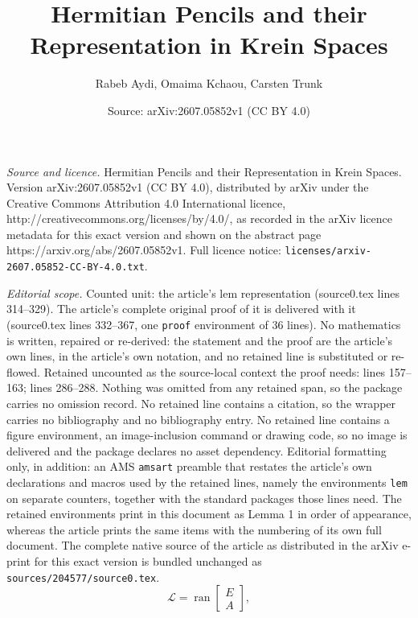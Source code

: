 \documentclass[10pt,a4paper]{amsart}
\title{Hermitian Pencils and their Representation in Krein Spaces}
\author{Rabeb Aydi, Omaima Kchaou, Carsten Trunk}
\date{Source: arXiv:2607.05852v1 (CC BY 4.0)}
\DeclareMathOperator{\ran}{ran}
\begin{document}
\maketitle

\noindent\emph{Source and licence.} Hermitian Pencils and their Representation in Krein Spaces. Version arXiv:2607.05852v1 (CC BY 4.0), distributed by arXiv under the Creative Commons Attribution 4.0 International licence, http://creativecommons.org/licenses/by/4.0/, as recorded in the arXiv licence metadata for this exact version and shown on the abstract page https://arxiv.org/abs/2607.05852v1. Full licence notice: \texttt{licenses/arxiv-2607.05852-CC-BY-4.0.txt}.\par\smallskip

\noindent\textit{Editorial scope.} Counted unit: the article's lem representation (source0.tex lines 314--329). The article's complete original proof of it is delivered with it (source0.tex lines 332--367, one \texttt{proof} environment of 36 lines). No mathematics is written, repaired or re-derived: the statement and the proof are the article's own lines, in the article's own notation, and no retained line is substituted or re-flowed.  Retained uncounted as the source-local context the proof needs: lines 157--163; lines 286--288.  Nothing was omitted from any retained span, so the package carries no omission record.  No retained line contains a citation, so the wrapper carries no bibliography and no bibliography entry.  No retained line contains a figure environment, an image-inclusion command or drawing code, so no image is delivered and the package declares no asset dependency.  Editorial formatting only, in addition: an AMS \texttt{amsart} preamble that restates the article's own declarations and macros used by the retained lines, namely the environments \texttt{lem} on separate counters, together with the standard packages those lines need.  The retained environments print in this document as Lemma 1 in order of appearance, whereas the article prints the same items with the numbering of its own full document.  The complete native source of the article as distributed in the arXiv e-print for this exact version is bundled unchanged as \texttt{sources/204577/source0.tex}.
\begin{equation} \label{range-kernel}
	\mathcal{L} = \ran\begin{bmatrix}
			E\\ A
			\end{bmatrix}, %
\end{equation} 
\end{document}
